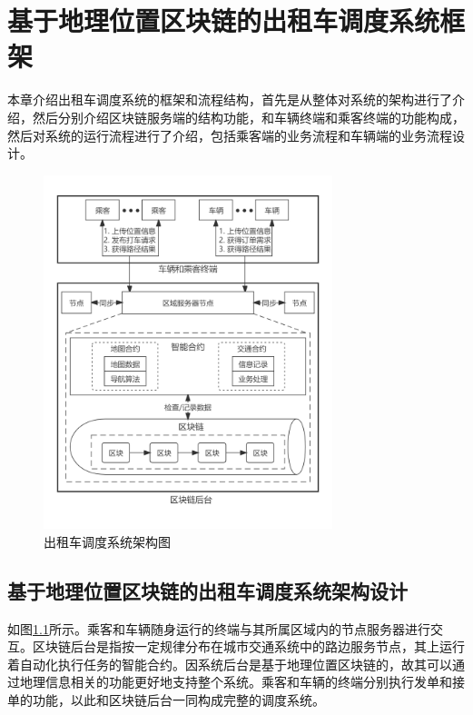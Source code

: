 \chapter{基于地理位置区块链的出租车调度系统框架}

本章介绍出租车调度系统的框架和流程结构，首先是从整体对系统的架构进行了介绍，然后分别介绍区块链服务端的结构功能，和车辆终端和乘客终端的功能构成，然后对系统的运行流程进行了介绍，包括乘客端的业务流程和车辆端的业务流程设计。

\begin{figure}[h]
  \centering
  \includegraphics[width=0.75\textwidth]{figures/structure}
  \caption{出租车调度系统架构图}\label{fig:structure}
\end{figure}

\section{基于地理位置区块链的出租车调度系统架构设计}
如图\ref{fig:structure}所示。乘客和车辆随身运行的终端与其所属区域内的节点服务器进行交互。区块链后台是指按一定规律分布在城市交通系统中的路边服务节点，其上运行着自动化执行任务的智能合约。因系统后台是基于地理位置区块链的，故其可以通过地理信息相关的功能更好地支持整个系统。乘客和车辆的终端分别执行发单和接单的功能，以此和区块链后台一同构成完整的调度系统。

